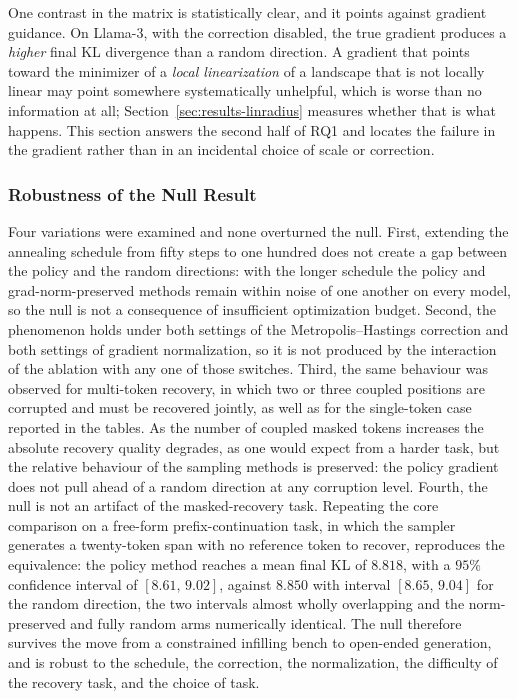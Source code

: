 One contrast in the matrix is statistically clear, and it points against gradient guidance. On Llama-3, with the correction disabled, the true gradient produces a \emph{higher} final KL divergence than a random direction. A gradient that points toward the minimizer of a \emph{local linearization} of a landscape that is not locally linear may point somewhere systematically unhelpful, which is worse than no information at all; Section~\ref{sec:results-linradius} measures whether that is what happens. This section answers the second half of RQ1 and locates the failure in the gradient rather than in an incidental choice of scale or correction.

\subsubsection{Robustness of the Null Result}
\label{sec:results-robust}

Four variations were examined and none overturned the null. First, extending the annealing schedule from fifty steps to one hundred does not create a gap between the policy and the random directions: with the longer schedule the policy and grad-norm-preserved methods remain within noise of one another on every model, so the null is not a consequence of insufficient optimization budget.
Second, the phenomenon holds under both settings of the Metropolis--Hastings correction and both settings of gradient normalization, so it is not produced by the interaction of the ablation with any one of those switches. Third, the same behaviour was observed for multi-token recovery, in which two or three coupled positions are corrupted and must be recovered jointly, as well as for the single-token case reported in the tables. As the number of coupled masked tokens increases the absolute recovery quality degrades, as one would expect from a harder task, but the relative behaviour of the sampling methods is preserved: the policy gradient does not pull ahead of a random direction at any corruption level. Fourth, the null is not an artifact of the masked-recovery task. Repeating the core comparison on a free-form prefix-continuation task, in which the sampler generates a twenty-token span with no reference token to recover, reproduces the equivalence: the policy method reaches a mean final KL of $8.818$, with a $95\%$ confidence interval of $[8.61,\, 9.02]$, against $8.850$ with interval $[8.65,\, 9.04]$ for the random direction, the two intervals almost wholly overlapping and the norm-preserved and fully random arms numerically identical.
The null therefore survives the move from a constrained infilling bench to open-ended generation, and is robust to the schedule, the correction, the normalization, the difficulty of the recovery task, and the choice of task.

